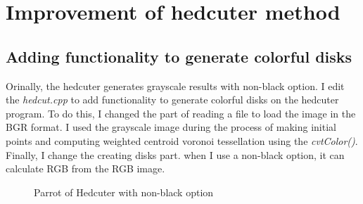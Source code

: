 \documentclass[11pt]{article}
\begin{document}
\section{Improvement of hedcuter method}
\subsection{Adding functionality to generate colorful disks}
Orinally, the hedcuter generates grayscale results with non-black option. I edit the \textit{hedcut.cpp} to add functionality to generate colorful disks on the hedcuter program. To do this, I changed the part of reading a file to load the image in the BGR format. I used the grayscale image during the process of making initial points and computing weighted centroid voronoi tessellation using the \textit{cvtColor()}. Finally, I change the creating disks part. when I use a non-black option, it can calculate RGB from the RGB image.
	\begin{figure}[ht] 
	\begin{center} 
	\hspace{5mm}
	\caption{Parrot of Hedcuter with non-black option} 
	\label{fig:parrotchedcuter}
	\end{center}
	\end{figure}
\end{document}
